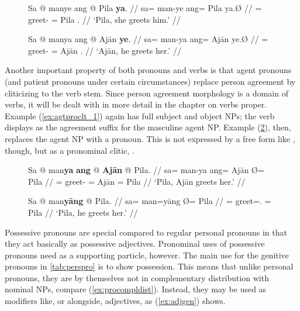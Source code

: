 \begin{figure}
\pex\label{ex:verbinfl2}
\a\begingl
	\gla Sa @ manye ang @ Pila \textbf{ya}. //
	\glb sa= man-ye ang= Pila ya.Ø //
	\glc \PatT{}= greet-\TsgF{} \Aarg{}= Pila \TsgM{}.\Top{} //
	\glft `Pila, she greets him.' //
\endgl

\a\begingl
	\gla Sa @ manya ang @ Ajān \textbf{ye}. //
	\glb sa= man-ya ang= ​Ajān ye.Ø //
	\glc \PatT{}= greet-\TsgM{} \Aarg{}= ​Ajān \TsgF{}.\Top{} //
	\glft `Ajān, he greets her.' //
\endgl
\xe
\end{figure}

Another important property of both pronouns and verbs is that agent pronouns
(and patient pronouns under certain circumstances) replace person agreement by
cliticizing to the verb stem. Since person agreement morphology is a domain of
verbs, it will be dealt with in more detail in the chapter on verbs proper. 
Example (\ref{ex:agtproclt_1}) again has full subject and object NPs; the verb
displays  as the agreement suffix for the masculine agent NP.
Example (\ref{ex:agtproclt_2}), then, replaces the agent NP with a pronoun.
This is not expressed by a free form like , though, but as a pronominal
clitic, .

\begin{figure}[h]
\pex\label{ex:agtproclt}
\a\label{ex:agtproclt_1}%
\begingl
	\gla Sa @ man\textbf{ya} \textbf{ang} @ \textbf{Ajān} {} @ Pila. //
	\glb sa= man-ya ang= ​Ajān Ø= ​Pila //
	\glc \PatT{}= greet-\TsgM{} \Aarg{}= ​Ajān \Top{}= ​Pila //
	\glft `Pila, Ajān greets her.' //
\endgl

\a\label{ex:agtproclt_2}%
\begingl
	\gla Sa @ man\textbf{yāng} {} @ Pila. //
	\glb sa= man=yāng Ø= ​Pila //
	\glc \PatT{}= greet=\TsgM{}.\Aarg{} \Top{}= Pila //
	\glft `Pila, he greets her.' //
\endgl
\xe
\end{figure}


\label{phsec:possadj}
Possessive pronouns are special compared to regular personal pronouns in that
they act basically as possessive adjectives. Pronominal uses of possessive
pronouns need  as a supporting particle, however. The main use
for the genitive pronouns in \autoref{tab:perspro} is to show possession. This
means that unlike personal pronouns, they are by themselves not in
complementary distribution with nominal NPs, compare (\ref{ex:procompldist}).
Instead, they may be used as modifiers like, or alongside, adjectives, as
(\ref{ex:adjgen}) shows.

